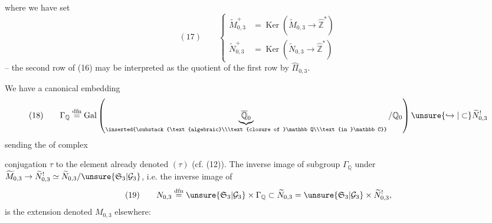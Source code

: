 where we have set
\[
(17)\qquad
\left\{\begin{aligned}
\widetilde M_{0,3}^{+}&=\operatorname{Ker}(\widetilde M_{0,3}\to\widehat{\mathbb Z}^{*})\\
\widetilde N_{0,3}^{+}&=\operatorname{Ker}(\widetilde N_{0,3}\to\widehat{\mathbb Z}^{*})
\end{aligned}\right.
\]
-- the second row of (16) may be interpreted as the quotient of the first row by $\widehat\Pi_{0,3}$.

We have a canonical embedding
\[
(18)\qquad
\Gamma_{\mathbb Q}\overset{\mathrm{dfn}}{=}
\operatorname{Gal}\left(
\underbrace{\overline{\mathbb Q}_0}_{\inserted{\substack{\text{algebraic}\\\text{closure of }\mathbb Q\\\text{in }\mathbb C}}}
/\mathbb Q_0\right)
\unsure{\hookrightarrow|\subset}\widetilde N_{0,3}^{!}
\]
sending the  of complex


conjugation $\tau$ to the element already denoted $(\tau)$ (cf. (12)). The inverse image of  subgroup $\Gamma_{\mathbb Q}$  under $\widetilde M_{0,3}\to\widetilde N_{0,3}^{!}\simeq\widetilde N_{0,3}/\unsure{\mathfrak S_3|\mathcal G_3}$, i.e. the inverse image of 
\[
(19)\qquad
N_{0,3}\overset{\mathrm{dfn}}{=}
\unsure{\mathfrak S_3|\mathcal G_3}\times\Gamma_{\mathbb Q}
\subset\widetilde N_{0,3}
=\unsure{\mathfrak S_3|\mathcal G_3}\times\widetilde N_{0,3}^{!},
\]
is the extension  denoted $M_{0,3}$ elsewhere:



